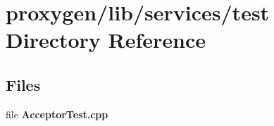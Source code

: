 \section{proxygen/lib/services/test Directory Reference}
\label{dir_ed22ffc9fa7d4206a60219f6027da30e}
\subsection*{Files}
\begin{DoxyCompactItemize}
\item 
file {\bf Acceptor\+Test.\+cpp}
\end{DoxyCompactItemize}
